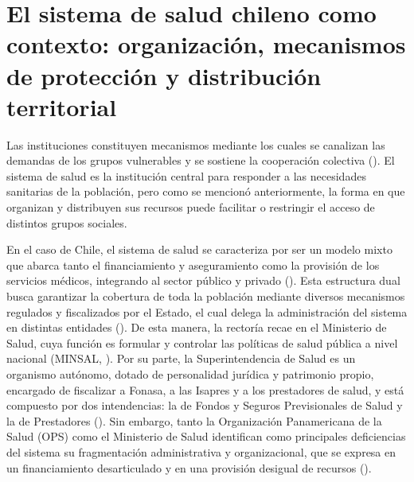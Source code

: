 \documentclass[
  spanish,
  a4paper,
  oneside]{scrbook}
\begin{document}
\section{El sistema de salud chileno como contexto: organización,
mecanismos de protección y distribución
territorial}\label{el-sistema-de-salud-chileno-como-contexto-organizaciuxf3n-mecanismos-de-protecciuxf3n-y-distribuciuxf3n-territorial}

Las instituciones constituyen mecanismos mediante los cuales se
canalizan las demandas de los grupos vulnerables y se sostiene la
cooperación colectiva
(). El
sistema de salud es la institución central para responder a las
necesidades sanitarias de la población, pero como se mencionó
anteriormente, la forma en que organizan y distribuyen sus recursos
puede facilitar o restringir el acceso de distintos grupos sociales.

En el caso de Chile, el sistema de salud se caracteriza por ser un
modelo mixto que abarca tanto el financiamiento y aseguramiento como la
provisión de los servicios médicos, integrando al sector público y
privado (). Esta estructura dual busca garantizar la cobertura de
toda la población mediante diversos mecanismos regulados y fiscalizados
por el Estado, el cual delega la administración del sistema en distintas
entidades (). De esta manera, la rectoría recae en el Ministerio de
Salud, cuya función es formular y controlar las políticas de salud
pública a nivel nacional (MINSAL,
). Por su parte, la
Superintendencia de Salud es un organismo autónomo, dotado de
personalidad jurídica y patrimonio propio, encargado de fiscalizar a
Fonasa, a las Isapres y a los prestadores de salud, y está compuesto por
dos intendencias: la de Fondos y Seguros Previsionales de Salud y la de
Prestadores (). Sin embargo, tanto la Organización Panamericana de la
Salud (OPS) como el Ministerio de Salud identifican como principales
deficiencias del sistema su fragmentación administrativa y
organizacional, que se expresa en un financiamiento desarticulado y en
una provisión desigual de recursos
().
\end{document}
